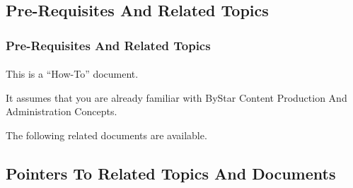 \subsection{Pre-Requisites And Related Topics}


\begin{comment}
*****  [[elisp:(org-cycle)][| ]]  [[elisp:(blee:ppmm:org-mode-toggle)][Nat]] [[elisp:(beginning-of-buffer)][Top]] [[elisp:(delete-other-windows)][(1)]] || /Frame/ *Label=Pre-RequisitesAndRelatedTopics*  Pre-Requisites And Related Topics ::  [[elisp:(org-cycle)][| ]]
\end{comment}

\begin{frame}[fragile,label=Pre-RequisitesAndRelatedTopics]
    \frametitle{Pre-Requisites And Related Topics}
    \framesubtitle{}

    This is a ``How-To'' document.

    \bigskip

    It assumes that you are already familiar with ByStar Content Production And Administration Concepts.

    The following related documents are available.

\end{frame}


\begin{comment}
**  [[elisp:(org-cycle)][| ]] [[elisp:(org-show-subtree)][|=]] [[elisp:(show-children 10)][|V]] [[elisp:(bx:orgm:indirectBufOther)][|>]] [[elisp:(bx:orgm:indirectBufMain)][|I]] [[elisp:(blee:ppmm:org-mode-toggle)][|N]] [[elisp:(org-top-overview)][|O]] [[elisp:(progn (org-shifttab) (org-content))][|C]] [[elisp:(delete-other-windows)][|1]]  /Subsection/   Pointers To Related Topics And Documents ::  [[elisp:(org-cycle)][| ]]
\end{comment}

\subsection{Pointers To Related Topics And Documents}


